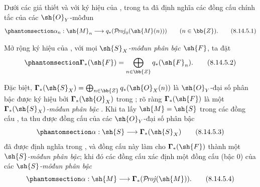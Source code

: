 \documentclass[oneside,10pt]{amsart}
\makeatletter
\newcommand{\ega@arrow}[2]{\mathchoice{#1}{#2}{#2}{#2}}
\renewcommand{\to}{\ega@arrow{\longrightarrow}{\rightarrow}}
\def\shProj{\mathcal{P}\!\mathit{roj}}
\newcommand{\oldpage}[2][]{\marginnote{\normalfont\footnotesize\textbf{#1}~|~#2}\ignorespaces}
\let\EGAOriginalLabel\label
\renewcommand{\label}[1]{\phantomsection\EGAOriginalLabel{#1}}
\makeatother
\begin{document}
\begin{env}[8.14.5]
\label{II.8.14.5}
Dưới các giả thiết và với ký hiệu của , trong  ta đã định nghĩa các đồng cấu chính tắc của các $\sh{O}_Y$-môđun
\[
\label{II.8.14.5.1}
    \alpha_n: \sh{M}_n \to q_*(\shProj_0(\sh{M}(n)))
    \qquad (n\in\bb{Z}).
\tag{8.14.5.1}
\]

Mở rộng ký hiệu của , với mọi \emph{$\sh{S}_X$-môđun phân bậc $\sh{F}$}, ta đặt
\[
\label{II.8.14.5.2}
    \boldsymbol{\Gamma}_*(\sh{F}) = \bigoplus_{n\in\bb{Z}}q_*(\sh{F}_n).
\tag{8.14.5.2}
\]

Đặc biệt, $\boldsymbol{\Gamma}_*(\sh{S}_X)=\bigoplus_{n\in\bb{Z}}q_*(\sh{O}_X(n))$ là $\sh{O}_Y$-đại số phân bậc được ký hiệu bởi $\boldsymbol{\Gamma}_*(\sh{O}_X)$ trong ;
rõ ràng $\boldsymbol{\Gamma}_*(\sh{F})$ là một \emph{$\boldsymbol{\Gamma}_*(\sh{S}_X)$-môđun phân bậc} .
Khi
\oldpage[II]{199}
ta lấy $\sh{M}=\sh{S}$ trong các đồng cấu , ta thu được đồng cấu của các $\sh{O}_Y$-đại số phân bậc
\[
\label{II.8.14.5.3}
    \alpha:\sh{S}\to\boldsymbol{\Gamma}_*(\sh{S}_X)
\tag{8.14.5.3}
\]
đã được định nghĩa trong , và đồng cấu này làm cho $\boldsymbol{\Gamma}_*(\sh{F})$ thành một \emph{$\sh{S}$-môđun phân bậc};
khi đó các đồng cấu  xác định một đồng cấu (bậc $0$) của các \emph{$\sh{S}$-môđun phân bậc}
\[
\label{II.8.14.5.4}
    \alpha:\sh{M}\to\boldsymbol{\Gamma}_*(\shProj(\sh{M})).
\tag{8.14.5.4}
\]
\end{env}
\end{document}
